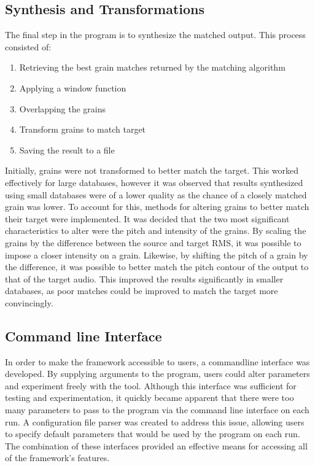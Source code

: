 \documentclass{scrartcl}
\begin{document}
    \subsection*{Synthesis and Transformations}
    The final step in the program is to synthesize the matched output.
    This process consisted of:
    \begin{enumerate}
        \item Retrieving the best grain matches returned by the matching algorithm
        \item Applying a window function
        \item Overlapping the grains 
        \item Transform grains to match target
        \item Saving the result to a file
    \end{enumerate}
    Initially, grains were not transformed to better match the target.  This
    worked effectively for large databases, however it was observed that
    results synthesized using small databases were of a lower quality as the
    chance of a closely matched grain was lower. To account for this, methods
    for altering grains to better match their target were implemented.  It was
    decided that the two most significant characteristics to alter were the
    pitch and intensity of the grains.  By scaling the grains by the difference
    between the source and target RMS, it was possible to impose a closer
    intensity on a grain. Likewise, by shifting the pitch of a grain by the
    difference, it was possible to better match the pitch contour of the output
    to that of the target audio.  This improved the results significantly in
    smaller databases, as poor matches could be improved to match the target
    more convincingly.

    \subsection*{Command line Interface}
    In order to make the framework accessible to users, a commandline interface
    was developed. By supplying arguments to the program, users could alter
    parameters and experiment freely with the tool.  Although this interface
    was sufficient for testing and experimentation, it quickly became apparent
    that there were too many parameters to pass to the program via the command
    line interface on each run. A configuration file parser was created to
    address this issue, allowing users to specify default parameters that would
    be used by the program on each run. The combination of these interfaces
    provided an effective means for accessing all of the framework's features.
\end{document}
